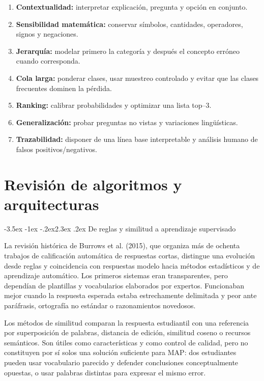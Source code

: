 \documentclass[11pt,oneside,openany]{book}
\makeatletter
\renewcommand\section{\@startsection{section}{1}{\z@}%
  {-3.5ex \@plus -1ex \@minus -.2ex}{2.3ex \@plus .2ex}%
  {\normalfont\Large\sffamily\bfseries\color{AzulMedio}}}
\makeatother
\begin{document}
\begin{enumerate}
  \item \textbf{Contextualidad:} interpretar explicación, pregunta y opción en
  conjunto.
  \item \textbf{Sensibilidad matemática:} conservar símbolos, cantidades,
  operadores, signos y negaciones.
  \item \textbf{Jerarquía:} modelar primero la categoría y después el concepto
  erróneo cuando corresponda.
  \item \textbf{Cola larga:} ponderar clases, usar muestreo controlado y evitar que
  las clases frecuentes dominen la pérdida.
  \item \textbf{Ranking:} calibrar probabilidades y optimizar una lista top--3.
  \item \textbf{Generalización:} probar preguntas no vistas y variaciones
  lingüísticas.
  \item \textbf{Trazabilidad:} disponer de una línea base interpretable y análisis
  humano de falsos positivos/negativos.
\end{enumerate}

\chapter{Revisión de algoritmos y arquitecturas}

\section{De reglas y similitud a aprendizaje supervisado}

La revisión histórica de Burrows et al. (2015), que organiza más de ochenta
trabajos de calificación automática de respuestas cortas, distingue una evolución
desde reglas y coincidencia con respuestas modelo hacia métodos estadísticos y de
aprendizaje automático. Los primeros sistemas eran transparentes, pero dependían
de plantillas y vocabularios elaborados por expertos. Funcionaban mejor cuando la
respuesta esperada estaba estrechamente delimitada y peor ante paráfrasis,
ortografía no estándar o razonamientos novedosos.

Los métodos de similitud comparan la respuesta estudiantil con una referencia por
superposición de palabras, distancia de edición, similitud coseno o recursos
semánticos. Son útiles como características y como control de calidad, pero no
constituyen por sí solos una solución suficiente para MAP: dos estudiantes pueden
usar vocabulario parecido y defender conclusiones conceptualmente opuestas, o usar
palabras distintas para expresar el mismo error.
\end{document}

